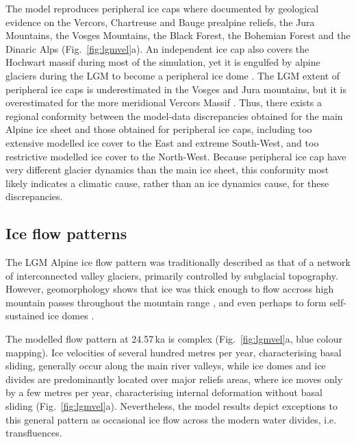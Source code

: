 \documentclass[tc, manuscript]{copernicus}
\begin{document}
    The model reproduces peripheral ice caps where documented by geological
    evidence on the Vercors, Chartreuse and Bauge prealpine reliefs,
    the Jura Mountains, the Vosges Mountains, the Black Forest, the Bohemian
    Forest and the Dinaric Alps (Fig.~\ref{fig:lgmvel}a). An independent ice
    cap also covers the Hochwart massif during most of the simulation, yet it
    is engulfed by alpine glaciers during the LGM to become a peripheral ice
    dome \citep[Fig.~\ref{fig:lgmvel}a; cf.][Fig.~2.5]{Husen.2011}. The LGM
    extent of peripheral ice caps is underestimated in the Vosges and Jura
    mountains, but it is overestimated for the more meridional Vercors Massif
    \citep[Fig.~\ref{fig:lgmvel}a; cf.][Figs.~4.28, 4.32, and 4.33,
    p.~322--321]{Coutterand.2010}. Thus, there exists a regional conformity
    between the model-data discrepancies obtained for the main Alpine ice sheet
    and those obtained for peripheral ice caps, including too extensive
    modelled ice cover to the East and extreme South-West, and too restrictive
    modelled ice cover to the North-West. Because peripheral ice cap have
    very different glacier dynamics than the main ice sheet, this conformity
    most likely indicates a climatic cause, rather than an ice dynamics cause,
    for these discrepancies.


\subsection{Ice flow patterns}
\label{sec:flow}

    The LGM Alpine ice flow pattern was traditionally described as that of a
    network of interconnected valley glaciers, primarily controlled by
    subglacial topography. However, geomorphology shows that ice was thick
    enough to flow accross high mountain passes throughout the mountain range
    \citep[e.g.,][]{Onde.1938, Penck.Bruckner.1909, Jackli.1962, Husen.1985,
    Coutterand.2010, Kelly.etal.2004, Husen.2011}, and even perhaps to form
    self-sustained ice domes \citep{Florineth.1998, Florineth.Schluchter.1998,
    Kelly.etal.2004, Bini.etal.2009}.

    The modelled flow pattern at 24.57\,ka is complex (Fig.~\ref{fig:lgmvel}a,
    blue colour mapping). Ice velocities of several hundred metres per year,
    characterising basal sliding, generally occur along the main river valleys,
    while ice domes and ice divides are predominantly located over major
    reliefs areas, where ice moves only by a few metres per year,
    characterising internal deformation without basal sliding
    (Fig.~\ref{fig:lgmvel}a). Nevertheless, the model results depict exceptions
    to this general pattern as occasional ice flow across the modern water
    divides, i.e. transfluences.
\end{document}
